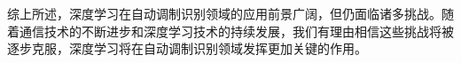 综上所述，深度学习在自动调制识别领域的应用前景广阔，但仍面临诸多挑战。随着通信技术的不断进步和深度学习技术的持续发展，我们有理由相信这些挑战将被逐步克服，深度学习将在自动调制识别领域发挥更加关键的作用。








